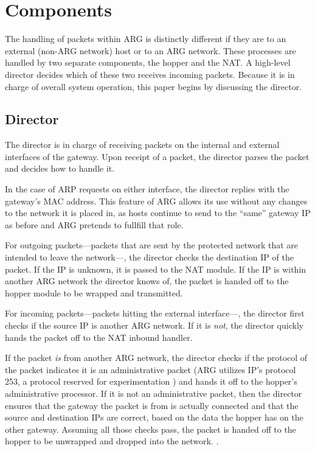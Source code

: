 \section{Components}
\label{sec:arg_components}
The handling of packets within ARG is distinctly different if they are to an external (non-ARG network) host or to an ARG network. These processes are handled by two separate components, the hopper and the NAT. A high-level director decides which of these two receives incoming packets. Because it is in charge of overall system operation, this paper begins by discussing the director.

\subsection{Director}
\label{sec:arg_director}
\par The director is in charge of receiving packets on the internal and external interfaces of the gateway. Upon receipt of a packet, the director parses the packet and decides how to handle it. 

\par In the case of \ac{ARP} requests on either interface, the director replies with the gateway's \ac{MAC} address. This feature of \ac{ARG} allows its use without any changes to the network it is placed in, as hosts continue to send to the ``same'' gateway IP as before and \ac{ARG} pretends to fullfill that role. 

\par For outgoing packets---packets that are sent by the protected network that are intended to leave the network---, the director checks the destination \ac{IP} of the packet. If the IP is unknown, it is passed to the \ac{NAT} module. If the IP is within another \ac{ARG} network the director knows of, the packet is handed off to the hopper module to be wrapped and transmitted.

\par For incoming packets---packets hitting the external interface---, the director first checks if the source IP is another ARG network. If it is \textit{not}, the director quickly hands the packet off to the NAT inbound handler.

\par If the packet \textit{is} from another ARG network, the director checks if the protocol of the packet indicates it is an administrative packet (ARG utilizes IP's protocol 253, a protocol reserved for experimentation \cite{IANAPorts}) and hands it off to the hopper's administrative processor. If it is not an administrative packet, then the director ensures that the gateway the packet is from is actually connected and that the source and destination IPs are correct, based on the data the hopper has on the other gateway. Assuming all those checks pass, the packet is handed off to the hopper to be unwrapped and dropped into the network.
.


